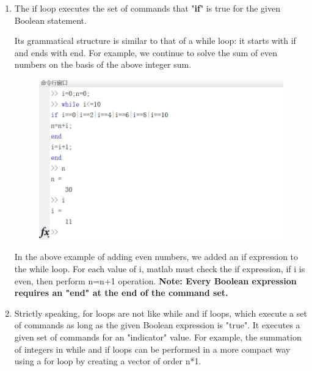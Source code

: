 \documentclass[10pt,math=newtx,citestyle=gb7714-2015,bibstyle=gb7714-2015]{elegantbook}
\begin{document}
{{{\begin{enumerate}
		The second step is to create a new variable, $n$, so that the new n is equal to the temporary value stored in the workspace. For example, the newly created n must be equal to the value of the workspace, that is, n=0;
		
		In the third step, when the Boolean statement in the while loop is "true", the first two steps are repeated, and the value of n is continuously upgraded until the final result is obtained, for example, when i=1, because in the second step n=0, so n+i=0+1=1, the value of 1 is stored in the workspace, and then the newly created n is equal to 1, repeat these steps, and finally get n=55.
		
		\item The if loop executes the set of commands that "\textbf{if}" is true for the given Boolean statement.
		
		Its grammatical structure is similar to that of a while loop: it starts with if and ends with end. For example, we continue to solve the sum of even numbers on the basis of the above integer sum.
		
		\begin{figure}[htbp!]
			\centering
			\includegraphics[width=0.8\linewidth]{FIG/evensum}
			\centering
		\end{figure}
		
	In the above example of adding even numbers, we added an if expression to the while loop. For each value of i, matlab must check the if expression, if i is even, then perform n=n+1 operation. \textbf{Note: Every Boolean expression requires an "end" at the end of the command set. }
	
	\item Strictly speaking, for loops are not like while and if loops, which execute a set of commands as long as the given Boolean expression is "true". It executes a given set of commands for an "indicator" value. For example, the summation of integers in while and if loops can be performed in a more compact way using a for loop by creating a vector of order n*1.
	

\end{enumerate}}}}
\end{document}
